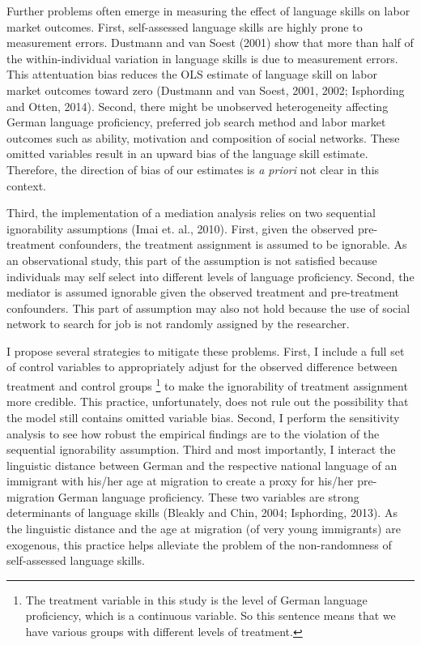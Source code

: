 \documentclass[12pt,a4paper]{article}
\begin{document}
Further problems often emerge in measuring the effect of language skills on labor market outcomes. First, self-assessed language skills are highly prone to measurement errors. Dustmann and van Soest (2001) show that more than half of the within-individual variation in language skills is due to measurement errors. This attentuation bias reduces the OLS estimate of language skill on labor market outcomes toward zero (Dustmann and van Soest, 2001, 2002; Isphording and Otten, 2014). Second, there might be unobserved heterogeneity affecting German language proficiency, preferred job search method and labor market outcomes such as ability, motivation and composition of social networks. These omitted variables result in an upward bias of the language skill estimate. Therefore, the direction of bias of our estimates is \textit{a priori} not clear in this context.

Third, the implementation of a mediation analysis relies on two sequential ignorability assumptions (Imai et. al., 2010). First, given the observed pre-treatment confounders, the treatment assignment is assumed to be ignorable. As an observational study, this part of the assumption is not satisfied because individuals may self select into different levels of language proficiency. Second, the mediator is assumed ignorable given the observed treatment and pre-treatment confounders. This part of assumption may also not hold because the use of social network to search for job is not randomly assigned by the researcher.

I propose several strategies to mitigate these problems. First, I include a full set of control variables to appropriately adjust for the observed difference between treatment and control groups \footnote {\tiny {The treatment variable in this study is the level of German language proficiency, which is a continuous variable. So this sentence means that we have various groups with different levels of treatment.}} to make the ignorability of treatment assignment more credible. This practice, unfortunately, does not rule out the possibility that the model still contains omitted variable bias. Second, I perform the sensitivity analysis to see how robust the empirical findings are to the violation of the sequential ignorability assumption. Third and most importantly, I interact the linguistic distance between German and the respective national language of an immigrant with his/her age at migration to create a proxy for his/her pre-migration German language proficiency. These two variables are strong determinants of language skills (Bleakly and Chin, 2004; Isphording, 2013). As the linguistic distance and the age at migration (of very young immigrants) are exogenous, this practice helps alleviate the problem of the non-randomness of self-assessed language skills.
\end{document}
